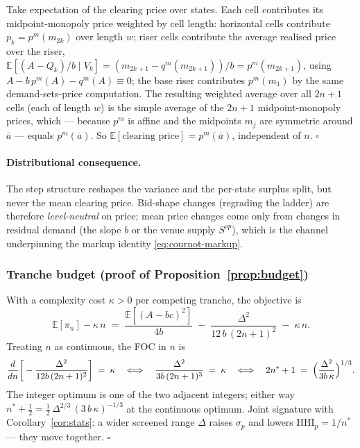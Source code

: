 \documentclass[11pt,a4paper]{article}
\theoremstyle{definition}
\theoremstyle{remark}
\theoremstyle{plain}
\begin{document}
Take expectation of the clearing price over states. Each cell contributes its midpoint-monopoly price weighted by cell length: horizontal cells contribute $p_k = p^m(m_{2k})$ over length $w$; riser cells contribute the average realised price over the riser, $\mathbb{E}[(A - Q_k)/b \mid V_k] = (m_{2k+1} - q^m(m_{2k+1}))/b = p^m(m_{2k+1})$, using $A - b\,p^m(A) - q^m(A) \equiv 0$; the base riser contributes $p^m(m_1)$ by the same demand-sets-price computation. The resulting weighted average over all $2n+1$ cells (each of length $w$) is the simple average of the $2n+1$ midpoint-monopoly prices, which --- because $p^m$ is affine and the midpoints $m_j$ are symmetric around $\bar a$ --- equals $p^m(\bar a)$. So $\mathbb{E}[\text{clearing price}] = p^m(\bar a)$, independent of $n$. $\square$

\paragraph{Distributional consequence.} The step structure reshapes the variance and the per-state surplus split, but never the mean clearing price. Bid-shape changes (regrading the ladder) are therefore \emph{level-neutral} on price; mean price changes come only from changes in residual demand (the slope $b$ or the venue supply $S^{op}$), which is the channel underpinning the markup identity \eqref{eq:cournot-markup}.

\subsubsection{Tranche budget (proof of Proposition~\ref{prop:budget})}\label{sec:tranche-app:budget}

With a complexity cost $\kappa > 0$ per competing tranche, the objective is
\[
\mathbb{E}[\pi_n] - \kappa\,n \;=\; \frac{\mathbb{E}[(A - bc)^2]}{4 b} \;-\; \frac{\Delta^2}{12\,b\,(2n+1)^2} \;-\; \kappa\,n.
\]
Treating $n$ as continuous, the FOC in $n$ is
\[
\frac{d}{dn}\bigg[-\frac{\Delta^2}{12 b\,(2n+1)^2}\bigg] \;=\; \kappa
\quad\Longleftrightarrow\quad
\frac{\Delta^2}{3 b\,(2n+1)^3} \;=\; \kappa
\quad\Longleftrightarrow\quad
2 n^* + 1 \;=\; \Bigl(\frac{\Delta^2}{3 b\,\kappa}\Bigr)^{1/3}.
\]
The integer optimum is one of the two adjacent integers; either way $n^* + \tfrac{1}{2} = \tfrac{1}{2}\,\Delta^{2/3}\,(3\,b\,\kappa)^{-1/3}$ at the continuous optimum. Joint signature with Corollary~\ref{cor:stats}: a wider screened range $\Delta$ raises $\sigma_p$ and lowers $\text{HHI}_p = 1/n^*$ --- they move together. $\square$
\end{document}
